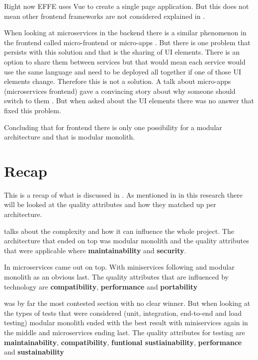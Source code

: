 Right now EFFE uses Vue to create a single page application. But this does not mean other frontend frameworks are not considered explained in .

When looking at microservices in the backend there is a similar phenomenon in the frontend called micro-frontend or micro-apps \cite{microFrontends}. But there is one problem that persists with this solution and that is the sharing of UI elements. There is an option to share them between services but that would mean each service would use the same language and need to be deployed all together if one of those UI elements change. Therefore this is not a solution. A talk about micro-apps (microservices frontend) gave a convincing story about why someone should switch to them \cite{frontendMicroservices}. But when asked about the UI elements there was no answer that fixed this problem.

Concluding that for frontend there is only one possibility for a modular architecture and that is modular monolith.

\section{Recap}

This is a recap of what is discussed in . As mentioned in  in this research there will be looked at the quality attributes and how they matched up per architecture.

 talks about the complexity and how it can influence the whole project. The architecture that ended on top was modular monolith and the quality attributes that were applicable where \textbf{maintainability} and \textbf{security}.

In  microservices came out on top. With miniservices following and modular monolith as an obvious last. The quality attributes that are influenced by technology are \textbf{compatibility}, \textbf{performance} and \textbf{portability}

 was by far the most contested section with no clear winner. But when looking at the types of tests that were considered (unit, integration, end-to-end and load testing) modular monolith ended with the best result with miniservices again in the middle and microservices ending last. The quality attributes for testing are \textbf{maintainability}, \textbf{compatibility}, \textbf{funtional sustiainability}, \textbf{performance} and \textbf{sustainability}

